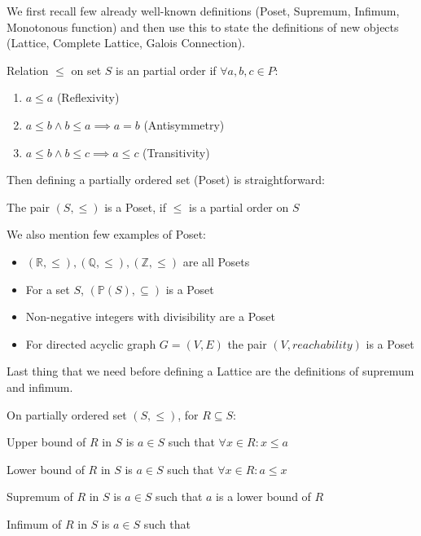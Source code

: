We first recall few already well-known definitions (Poset, Supremum, Infimum, Monotonous function) and then use this
to state the definitions of new objects (Lattice, Complete Lattice, Galois Connection).

\begin{defn}
    Relation $\leq$ on set $S$ is an partial order if $\forall a, b, c \in P$:
    \begin{enumerate}
        \item $a \leq a$ (Reflexivity)
        \item $a \leq b \land b \leq a \implies a = b$ (Antisymmetry)
        \item $a \leq b \land b \leq c \implies a \leq c$ (Transitivity)
    \end{enumerate}
\end{defn}

Then defining a partially ordered set (Poset) is straightforward:

\begin{defn}[Poset]
    The pair $(S, \leq)$ is a Poset, if $\leq$ is a partial order on $S$
\end{defn}

We also mention few examples of Poset:

\begin{itemize}
    \item $(\mathbb{R}, \leq), (\mathbb{Q}, \leq), (\mathbb{Z}, \leq)$ are all Posets
    \item For a set $S$, $(\mathbb{P}(S), \subseteq)$ is a Poset
    \item Non-negative integers with divisibility are a Poset
    \item For directed acyclic graph $G=(V,E)$ the pair $(V, reachability)$ is a Poset
\end{itemize}


Last thing that we need before defining a Lattice are the definitions of supremum and infimum.

\begin{defn}
    On partially ordered set $(S, \leq)$, for $R \subseteq S$:

    Upper bound of $R$ in $S$ is $a \in S$ such that $\forall x \in R: x \leq a$

    Lower bound of $R$ in $S$ is $a \in S$ such that $\forall x \in R: a \leq x$

    Supremum of $R$ in $S$ is $a \in S$ such that $a$ is a lower bound of $R$ %

    Infimum of $R$ in $S$ is $a \in S$ such that
\end{defn}


